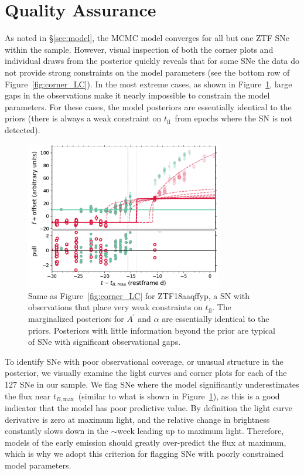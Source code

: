 \documentclass[twocolumn]{./aastex63}
\newcommand{\tfl}{$t_\mathrm{fl}$}
\newcommand{\tbmax}{$t_{B,\mathrm{max}}$}
\begin{document}
\appendix

\section{Quality Assurance}\label{sec:qa}

As noted in \S\ref{sec:model}, the MCMC model converges for all but one ZTF
SNe within the sample. However, visual inspection of both the corner plots and
individual draws from the posterior quickly reveals that for some SNe the data
do not provide strong constraints on the model parameters (see the bottom row
of Figure~\ref{fig:corner_LC}). In the most extreme cases, as shown in
Figure~\ref{fig:biggap_lc}, large gaps in the observations make it nearly
impossible to constrain the model parameters. For these cases, the model
posteriors are essentially identical to the priors (there is always a weak
constraint on \tfl\ from epochs where the SN is not detected).

\begin{figure}
    \centering
    \includegraphics[width=3.4in]{./figures/ZTF18aaqffyp_model_lc.pdf}
    \caption{Same as Figure~\ref{fig:corner_LC} for ZTF18aaqffyp, a SN with
    observations that place very weak constraints on \tfl. The marginalized
    posteriors for $A^\prime$ and $\alpha$ are essentially identical to the
    priors. Posteriors with little information beyond the prior are typical
    of SNe with significant observational gaps.}
    \label{fig:biggap_lc}
\end{figure}

To identify SNe with poor observational coverage, or unusual structure in the
posterior, we visually examine the light curves and corner plots for each of
the 127 SNe in our sample. We flag SNe where the model significantly
underestimates the flux near \tbmax\ (similar to what is shown in
Figure~\ref{fig:biggap_lc}), as this is a good indicator that the model has
poor predictive value. By definition the light curve derivative is zero at
maximum light, and the relative change in brightness constantly slows down in
the $\sim$week leading up to maximum light. Therefore, models of the early
emission should greatly over-predict the flux at maximum, which is why we
adopt this criterion for flagging SNe with poorly constrained model
parameters.
\end{document}
